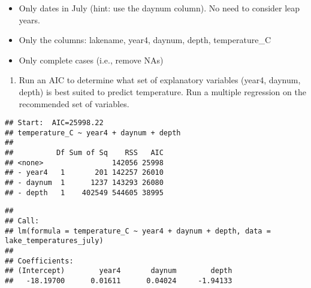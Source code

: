 \documentclass[]{article}
\newenvironment{Shaded}{\begin{snugshade}}{\end{snugshade}}
\newcommand{\CommentTok}[1]{\textcolor[rgb]{0.56,0.35,0.01}{\textit{#1}}}
\newcommand{\DataTypeTok}[1]{\textcolor[rgb]{0.13,0.29,0.53}{#1}}
\newcommand{\DecValTok}[1]{\textcolor[rgb]{0.00,0.00,0.81}{#1}}
\newcommand{\KeywordTok}[1]{\textcolor[rgb]{0.13,0.29,0.53}{\textbf{#1}}}
\newcommand{\NormalTok}[1]{#1}
\newcommand{\OperatorTok}[1]{\textcolor[rgb]{0.81,0.36,0.00}{\textbf{#1}}}
\newcommand{\StringTok}[1]{\textcolor[rgb]{0.31,0.60,0.02}{#1}}
\providecommand{\tightlist}{%
  \setlength{\itemsep}{0pt}\setlength{\parskip}{0pt}}
\begin{document}
\begin{itemize}
\tightlist
\item
  Only dates in July (hint: use the daynum column). No need to consider
  leap years.
\item
  Only the columns: lakename, year4, daynum, depth, temperature\_C
\item
  Only complete cases (i.e., remove NAs)
\end{itemize}

\begin{enumerate}
\def\labelenumi{\arabic{enumi}.}
\setcounter{enumi}{3}
\tightlist
\item
  Run an AIC to determine what set of explanatory variables (year4,
  daynum, depth) is best suited to predict temperature. Run a multiple
  regression on the recommended set of variables.
\end{enumerate}

\begin{Shaded}
\end{Shaded}

\begin{verbatim}
## Start:  AIC=25998.22
## temperature_C ~ year4 + daynum + depth
## 
##          Df Sum of Sq    RSS   AIC
## <none>                142056 25998
## - year4   1       201 142257 26010
## - daynum  1      1237 143293 26080
## - depth   1    402549 544605 38995
\end{verbatim}

\begin{verbatim}
## 
## Call:
## lm(formula = temperature_C ~ year4 + daynum + depth, data = lake_temperatures_july)
## 
## Coefficients:
## (Intercept)        year4       daynum        depth  
##   -18.19700      0.01611      0.04024     -1.94133
\end{verbatim}
\end{document}

